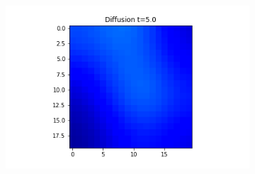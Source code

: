 \documentclass[10pt,a4paper]{article}
\begin{document}
\begin{figure}[!h]
\begin{subfigure}[b]{0.25\textwidth}
    \end{subfigure}~
    \begin{subfigure}[b]{0.25\textwidth}
    	\includegraphics[width= \textwidth]{images/grid-t5-x0.png}
    \end{subfigure}
\end{figure}
\end{document}
